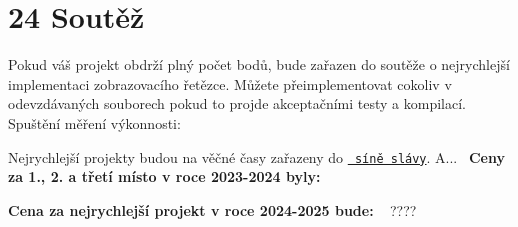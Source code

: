 \chapter{24 Soutěž}
\hypertarget{p24_soutez}{}\label{p24_soutez}
Pokud váš projekt obdrží plný počet bodů, bude zařazen do soutěže o nejrychlejší implementaci zobrazovacího řetězce. Můžete přeimplementovat cokoliv v odevzdávaných souborech pokud to projde akceptačními testy a kompilací.~\newline
 Spuštění měření výkonnosti\+: 
\begin{DoxyCode}{0}

\end{DoxyCode}
 Nejrychlejší projekty budou na věčné časy zařazeny do \href{https://www.fit.vut.cz/person/imilet/public/sinSlavy/}{\texttt{ síně slávy}}. A...~\newline
 {\bfseries{Ceny za 1., 2. a třetí místo v roce 2023-\/2024 byly\+:}} ~\newline
   

{\bfseries{Cena za nejrychlejší projekt v roce 2024-\/2025 bude\+:}} ~\newline
 ???? 
